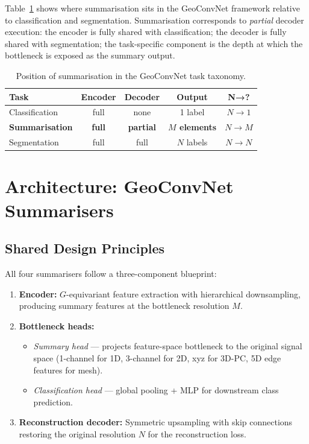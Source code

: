 \documentclass[10pt,conference]{IEEEtran}
\begin{document}
Table~\ref{tab:analogy} shows where summarisation sits in the GeoConvNet
framework relative to classification and segmentation.  Summarisation
corresponds to \emph{partial} decoder execution: the encoder is fully
shared with classification; the decoder is fully shared with segmentation;
the task-specific component is the depth at which the bottleneck is
exposed as the summary output.

\begin{table}[t]
  \renewcommand{\arraystretch}{1.2}
  \caption{Position of summarisation in the GeoConvNet task taxonomy.}
  \label{tab:analogy}
  \centering
  \begin{tabular}{lcccc}
    \toprule
    \textbf{Task} & \textbf{Encoder} & \textbf{Decoder} & \textbf{Output} & \textbf{N→?} \\
    \midrule
    Classification  & full  & none  & 1 label      & $N \to 1$ \\
    \textbf{Summarisation} & \textbf{full}  & \textbf{partial} & \textbf{$M$ elements} & $N \to M$ \\
    Segmentation    & full  & full  & $N$ labels   & $N \to N$ \\
    \bottomrule
  \end{tabular}
\end{table}

\section{Architecture: GeoConvNet Summarisers}
\label{sec:architecture}

\subsection{Shared Design Principles}

All four summarisers follow a three-component blueprint:
\begin{enumerate}
  \item \textbf{Encoder:} $G$-equivariant feature extraction with
    hierarchical downsampling, producing summary features at the
    bottleneck resolution $M$.
  \item \textbf{Bottleneck heads:}
    \begin{itemize}
      \item \emph{Summary head} — projects feature-space bottleneck to
        the original signal space (1-channel for 1D, 3-channel for 2D,
        xyz for 3D-PC, 5D edge features for mesh).
      \item \emph{Classification head} — global pooling + MLP for
        downstream class prediction.
    \end{itemize}
  \item \textbf{Reconstruction decoder:} Symmetric upsampling with skip
    connections restoring the original resolution $N$ for the
    reconstruction loss.
\end{enumerate}
\end{document}
